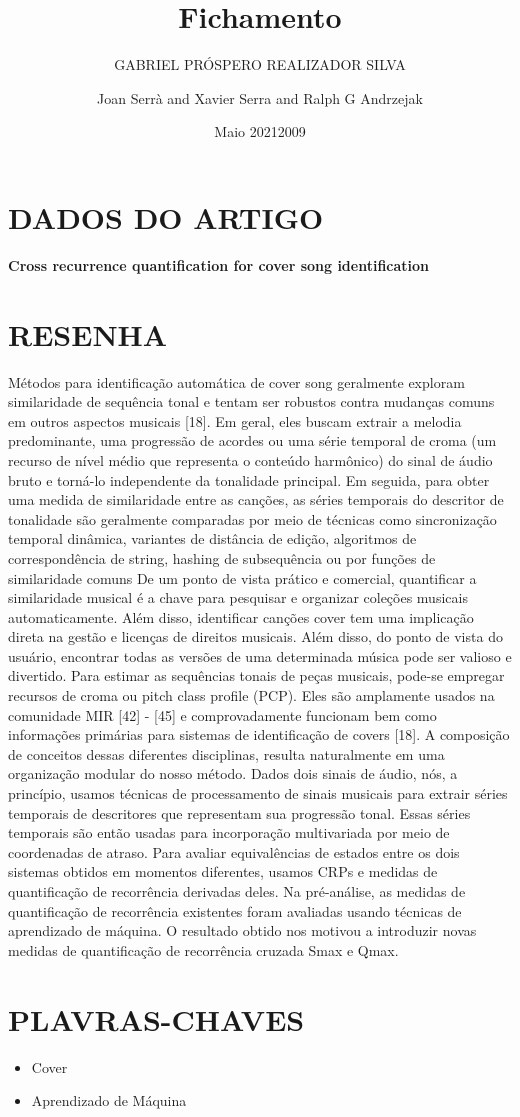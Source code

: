 \documentclass{article}
\title{Fichamento}
\author{GABRIEL PRÓSPERO REALIZADOR  SILVA}
\date{Maio 2021}
\begin{document}
\maketitle

\section{DADOS DO ARTIGO}
\textbf{Cross recurrence quantification for cover song identification \\}
\author{Joan Serr{\`{a}} and Xavier Serra and Ralph G Andrzejak\\}
\date{2009}

\section{RESENHA}
Métodos para identificação automática de cover song geralmente exploram similaridade de sequência tonal e tentam ser robustos contra mudanças comuns em outros aspectos musicais [18]. 
Em geral, eles buscam extrair a melodia predominante, uma progressão de acordes ou uma série temporal de croma (um recurso de nível médio que representa o conteúdo harmônico) do sinal de áudio bruto e torná-lo independente da tonalidade principal. 
Em seguida, para obter uma medida de similaridade entre as canções, as séries temporais do descritor de tonalidade são geralmente comparadas por meio de técnicas como sincronização temporal dinâmica, variantes de distância de edição, algoritmos de correspondência de string, hashing de subsequência ou por funções de similaridade comuns
De um ponto de vista prático e comercial, quantificar a similaridade musical é a chave para pesquisar e organizar coleções musicais automaticamente. Além disso, identificar canções cover tem uma implicação direta na gestão e licenças de direitos musicais. Além disso, do ponto de vista do usuário, encontrar todas as versões de uma determinada música pode ser valioso e divertido. 
Para estimar as sequências tonais de peças musicais, pode-se empregar recursos de croma ou pitch class profile (PCP). 
Eles são amplamente usados ​​na comunidade MIR [42] - [45] e comprovadamente funcionam bem como informações primárias para sistemas de identificação de covers [18].
A composição de conceitos dessas diferentes disciplinas, resulta naturalmente em uma organização modular do nosso método. Dados dois sinais de áudio, nós, a princípio, usamos técnicas de processamento de sinais musicais para extrair séries temporais de descritores que representam sua progressão tonal. 
Essas séries temporais são então usadas para incorporação multivariada por meio de coordenadas de atraso. Para avaliar equivalências de estados entre os dois sistemas obtidos em momentos diferentes, usamos CRPs e medidas de quantificação de recorrência derivadas deles. 
Na pré-análise, as medidas de quantificação de recorrência existentes foram avaliadas usando técnicas de aprendizado de máquina. 
O resultado obtido nos motivou a introduzir novas medidas de quantificação de recorrência cruzada Smax e Qmax.
\section{PLAVRAS-CHAVES}
\begin{itemize}
    \item Cover
    \item Aprendizado de Máquina
\end{itemize}
\end{document}
